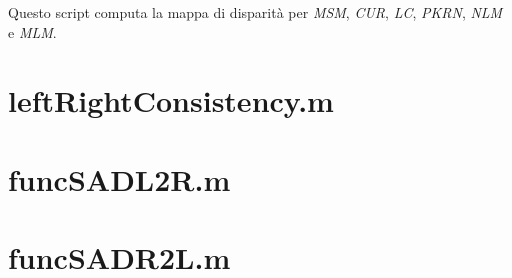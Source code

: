 \documentclass[12pt]{report}
\newcommand{\nullpage}{\newpage\null\thispagestyle{empty}}  %
\begin{document}
			Questo script computa la mappa di disparità per \textit{MSM}, \textit{CUR}, \textit{LC}, \textit{PKRN}, \textit{NLM} e \textit{MLM}.
	
			
		
		\newpage
		\section{leftRightConsistency.m}
		\label{sec:leftRightConsistency}
				
			
		\newpage
		\section{funcSADL2R.m}
		\label{sec:funcSADL2R}
			
			
		\newpage
		\section{funcSADR2L.m}
		\label{sec:funcSADR2L}
					




	\nullpage
	
\end{document}
